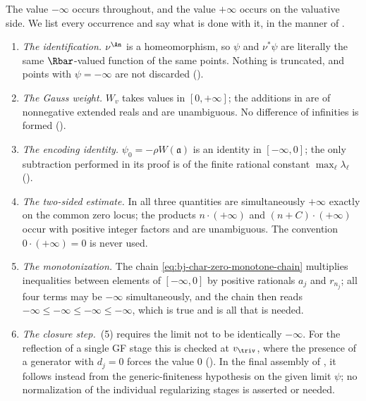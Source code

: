 The value $-\infty$ occurs throughout, and the value $+\infty$ occurs on
the valuative side.  We list every occurrence and say what is done with it,
in the manner of .

\begin{enumerate}
\item\label{itm:ch44-er:homeo}
      \emph{The identification.}  $\nu^{\An}$ is a homeomorphism, so
      $\psi$ and $\nu^*\psi$ are literally the same
      $\Rbar$-valued function of the same points.  Nothing is truncated,
      and points with $\psi=-\infty$ are not discarded
      ().
\item\label{itm:ch44-er:gauss}
      \emph{The Gauss weight.}  $W_v$ takes values in $[0,+\infty]$;
      the additions in  are of nonnegative
      extended reals and are unambiguous.  No difference of infinities is
      formed ().
\item\label{itm:ch44-er:encoding}
      \emph{The encoding identity.}  $\psi_0=-\rho W(\mathfrak a)$ is an
      identity in $[-\infty,0]$; the only subtraction performed in its
      proof is of the finite rational constant $\max_\ell\lambda_\ell$
      ().
\item\label{itm:ch44-er:sandwich}
      \emph{The two-sided estimate.}  In
       all three quantities are
      simultaneously $+\infty$ exactly on the common zero locus; the
      products $n\cdot(+\infty)$ and $(n+C)\cdot(+\infty)$ occur with
      positive integer factors and are unambiguous.  The convention
      $0\cdot(+\infty)=0$ is never used.
\item\label{itm:ch44-er:monotone}
      \emph{The monotonization.}  The chain
      \eqref{eq:bj-char-zero-monotone-chain} multiplies inequalities between
      elements of $[-\infty,0]$ by positive rationals $a_j$ and
      $r_{n_j}$; all four terms may be $-\infty$ simultaneously, and the
      chain then reads $-\infty\le-\infty\le-\infty\le-\infty$, which is
      true and is all that is needed.
\item\label{itm:ch44-er:psh2}
      \emph{The closure step.}  \,(5) requires
      the limit not to be identically $-\infty$.  For the reflection of a
      single GF stage this is checked at $v_\triv$, where the presence of
      a generator with $d_j=0$ forces the value $0$
      ().  In the final assembly of
      , it follows instead from
      the generic-finiteness hypothesis on the given limit $\psi$; no
      normalization of the individual regularizing stages is asserted or
      needed.
\end{enumerate}

